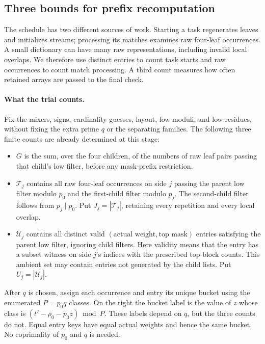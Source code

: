 \subsection{Three bounds for prefix recomputation}
\label{sec:prefix-accounting}

The schedule has two different sources of work. Starting a task
regenerates leaves and initializes streams; processing its matches
examines raw four-leaf occurrences. A small dictionary can have many
raw representations, including invalid local overlaps. We therefore
use distinct entries to count task starts and raw occurrences to count
match processing. A third count measures how often retained arrays
are passed to the final check.

\paragraph{What the trial counts.}
Fix the mixers, signs, cardinality guesses, layout, low moduli, and
low residues, without fixing the extra prime $q$ or the separating
families. The following three finite counts are already determined at this stage:
\begin{itemize}
\item $G$ is the sum, over the four children, of the numbers of raw
leaf pairs passing that child's low filter, before any mask-prefix
restriction.
\item $\mathcal T_j$ contains all raw four-leaf occurrences on side
$j$ passing the parent low filter modulo $p_0$ and the first-child
filter modulo $p_j$. The second-child filter follows from
$p_j\mid p_0$. Put $J_j=|\mathcal T_j|$, retaining every repetition
and every local overlap.
\item $\mathcal U_j$ contains all distinct valid
$(\text{actual weight},\text{top mask})$ entries satisfying the
parent low filter, ignoring child filters. Here validity means that
the entry has a subset witness on side $j$'s indices with the
prescribed top-block counts. This ambient set may contain entries
not generated by the child lists. Put $U_j=|\mathcal U_j|$.
\end{itemize}
After $q$ is chosen, assign each occurrence and entry its unique
bucket using the enumerated $P=p_0q$ classes. On the right the bucket
label is the value of $z$ whose class is
$(t'-\rho_0-p_0z)\bmod P$. These labels depend on $q$, but the three
counts do not. Equal entry keys have equal actual weights and hence
the same bucket. No coprimality of $p_0$ and $q$ is needed.


